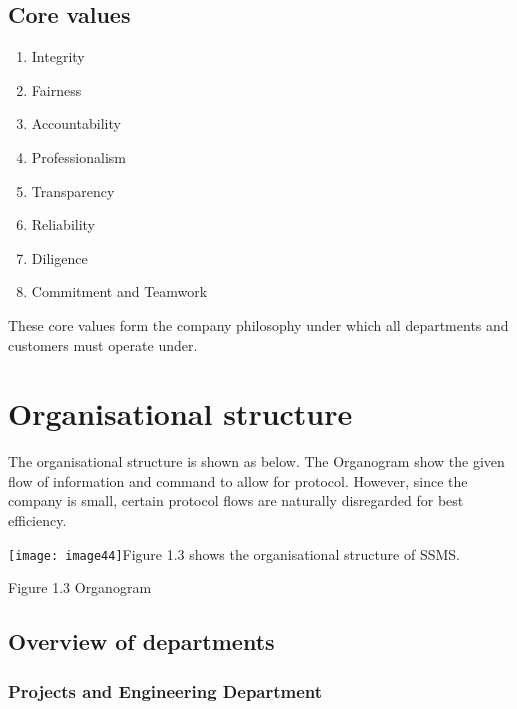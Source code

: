 \subsection{ Core values}

\begin{enumerate}
\item \textbf{ }Integrity

\item  Fairness

\item  Accountability

\item  Professionalism

\item  Transparency

\item  Reliability

\item  Diligence

\item  Commitment and Teamwork
\end{enumerate}

\noindent These core values form the company philosophy under which all departments and customers must operate under. 


\section{ Organisational structure}

\noindent The organisational structure is shown as below. The Organogram show the given flow of information and command to allow for protocol. However, since the company is small, certain protocol flows are naturally disregarded for best efficiency. \par

\noindent \texttt{[image: image44]}Figure 1.3 shows the organisational structure of SSMS. 

\noindent Figure 1.3 Organogram


\subsection{ Overview of departments}


\subsubsection{ Projects and Engineering Department}

